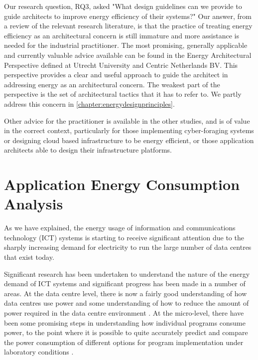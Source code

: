Our research question, RQ3, asked "What design guidelines can we provide to guide architects to improve energy efficiency of their systems?"  Our answer, from a  review of the relevant research literature, is that the practice of treating energy efficiency as an architectural concern is still immature and more assistance is needed for the industrial practitioner.  The most promising, generally applicable and currently valuable advice available can be found in the Energy Architectural Perspective defined at Utrecht University and Centric Netherlands BV.  This perspective provides a clear and useful approach to guide the architect in addressing energy as an architectural concern.  The weakest part of the perspective is the set of architectural tactics that it has to refer to.  We partly address this concern in \cref{chapter:energydesignprinciples}.

Other advice for the practitioner is available in the other studies, and is of value in the correct context, particularly for those implementing cyber-foraging systems or designing cloud based infrastructure to be energy efficient, or those application architects able to design their infrastructure platforms.

\section{Application Energy Consumption Analysis} \label{sec:litreviewenergy}

As we have explained, the energy usage of information and communications technology (ICT) systems is starting to receive significant attention due to the sharply increasing demand for electricity to run the large number of data centres that exist today.

Significant research has been undertaken to understand the nature of the energy demand of ICT systems and significant progress has been made in a number of areas.  At the data centre level, there is now a fairly good understanding of how data centres use power and some understanding of how to reduce the amount of power required in the data centre environment \cite{dc4cities2014_dcmetrics, dayarathna2016-dcenergy}.  At the micro-level, there have been some promising steps in understanding how individual programs consume power, to the point where it is possible to quite accurately predict and compare the power consumption of different options for program implementation under laboratory conditions \cite{bourdon2013-powerapi, noureddine2012-hotspots, islam2016-energysoftwarefeatures, acar2016-beyondcpu}.

